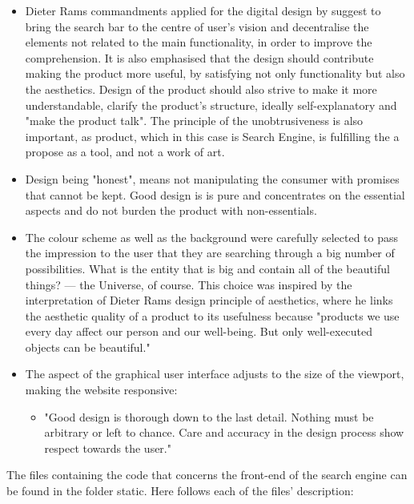 \begin{itemize}
    \item Dieter Rams commandments applied for the digital design by \citep{domingo:designprinciples} suggest to bring the search bar to the centre of user's vision and decentralise the elements not related to the main functionality, in order to improve the comprehension. It is also emphasised that the design should contribute making the product more useful, by satisfying not only functionality but also the aesthetics. Design of the product should also strive to make it more understandable, clarify the product’s structure, ideally self-explanatory and  "make the product talk". The principle of the unobtrusiveness is also important, as product, which in this case is Search Engine, is fulfilling the a propose as a tool, and not a work of art.
    \item Design being "honest", means not manipulating the consumer with promises that cannot be kept. Good design is is pure and concentrates on the essential aspects and do not burden the product with non-essentials.\citep{domingo:designprinciples}
    \item The colour scheme as well as the background were carefully selected to pass the impression to the user that they are searching through a big number of possibilities. What is the entity that is big and contain all of the beautiful things? — the Universe, of course. This choice was inspired by the \citep{domingo:designprinciples} interpretation of Dieter Rams design principle of aesthetics, where he links the aesthetic quality of a product to its usefulness because "products we use every day affect our person and our well-being. But only well-executed objects can be beautiful." \citep{domingo:designprinciples}
    \item The aspect of the graphical user interface adjusts to the size of the viewport, making the website responsive:
    \begin{itemize}
        \item "Good design is thorough down to the last detail. Nothing must be arbitrary or left to chance. Care and accuracy in the design process show respect towards the user." \citep{domingo:designprinciples}
    \end{itemize}
\end{itemize}
The files containing the code that concerns the front-end of the search engine can be found in the folder static. Here follows each of the files' description:
